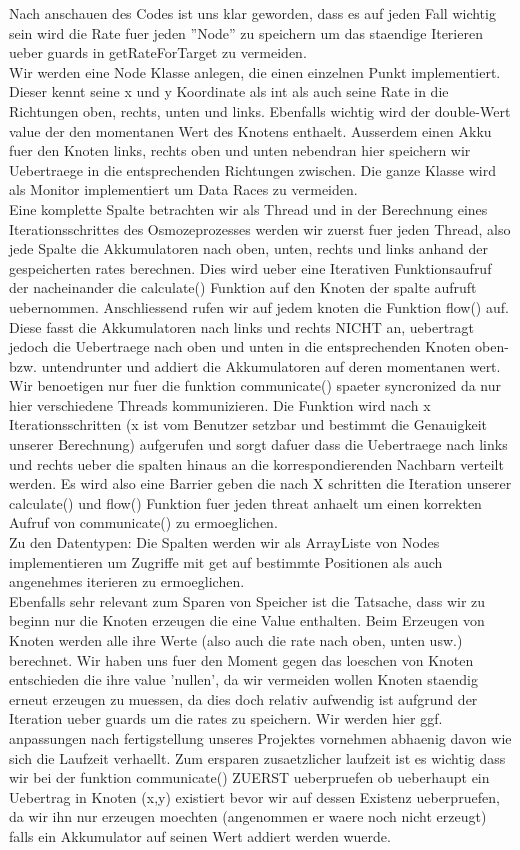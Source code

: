 \documentclass[12pt]{article}
\begin{document}
Nach anschauen des Codes ist uns klar geworden, dass es auf jeden Fall wichtig sein wird die Rate fuer jeden ''Node'' zu speichern um das staendige Iterieren ueber guards in getRateForTarget zu vermeiden.\\
Wir werden eine Node Klasse anlegen, die einen einzelnen Punkt implementiert. Dieser kennt seine x und y Koordinate als int als auch seine Rate in die Richtungen oben, rechts, unten und links. Ebenfalls wichtig wird der double-Wert value der den momentanen Wert des Knotens enthaelt. Ausserdem einen Akku fuer den Knoten links, rechts oben und unten nebendran hier speichern wir Uebertraege in die entsprechenden Richtungen zwischen. Die ganze Klasse wird als Monitor implementiert um Data Races zu vermeiden. \\
Eine komplette Spalte betrachten wir als Thread und in der Berechnung eines Iterationsschrittes des Osmozeprozesses werden wir zuerst fuer jeden Thread, also jede Spalte die Akkumulatoren nach oben, unten, rechts und links anhand der gespeicherten rates berechnen. Dies wird ueber eine Iterativen Funktionsaufruf der nacheinander die calculate() Funktion auf den Knoten der spalte aufruft uebernommen. Anschliessend rufen wir auf jedem knoten die Funktion flow() auf. Diese fasst die Akkumulatoren nach links und rechts NICHT an, uebertragt jedoch die Uebertraege nach oben und unten in die entsprechenden Knoten oben- bzw. untendrunter und addiert die Akkumulatoren auf deren momentanen wert. Wir benoetigen nur fuer die funktion communicate() spaeter syncronized da nur hier verschiedene Threads kommunizieren. Die Funktion wird nach x Iterationsschritten (x ist vom Benutzer setzbar und bestimmt die Genauigkeit unserer Berechnung) aufgerufen und sorgt dafuer dass die Uebertraege nach links und rechts ueber die spalten hinaus an die korrespondierenden Nachbarn verteilt werden. Es wird also eine Barrier geben die nach X schritten die Iteration unserer calculate() und flow() Funktion fuer jeden threat anhaelt um einen korrekten Aufruf von communicate() zu ermoeglichen.\\
Zu den Datentypen: Die Spalten werden wir als ArrayListe von Nodes implementieren um Zugriffe mit get auf bestimmte Positionen als auch angenehmes iterieren zu ermoeglichen.\\
Ebenfalls sehr relevant zum Sparen von Speicher ist die Tatsache, dass wir zu beginn nur die Knoten erzeugen die eine Value enthalten. Beim Erzeugen von Knoten werden alle ihre Werte (also auch die rate nach oben, unten usw.) berechnet. Wir haben uns fuer den Moment gegen das loeschen von Knoten entschieden die ihre value 'nullen', da wir vermeiden wollen Knoten staendig erneut erzeugen zu muessen, da dies doch relativ aufwendig ist aufgrund der Iteration ueber guards um die rates zu speichern. Wir werden hier ggf. anpassungen nach fertigstellung unseres Projektes vornehmen abhaenig davon wie sich die Laufzeit verhaellt. Zum ersparen zusaetzlicher laufzeit ist es wichtig dass wir bei der funktion communicate() ZUERST ueberpruefen ob ueberhaupt ein Uebertrag in Knoten (x,y) existiert bevor wir auf dessen Existenz ueberpruefen, da wir ihn nur erzeugen moechten (angenommen er waere noch nicht erzeugt) falls ein Akkumulator auf seinen Wert addiert werden wuerde.\\
\end{document}
